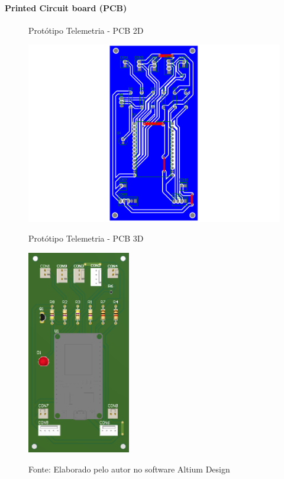 \documentclass[../delivery_hospital_report.tex]{subfiles}
\begin{document}
\paragraph{Printed Circuit board (PCB)}

\begin{figure}[!ht]
    \centering
    \begin{minipage}{0.5\textwidth}
        \centering
        \caption{Protótipo Telemetria - PCB 2D}
        \includegraphics[width=1.03\textwidth]{modulos/Telemetria-2.png} 
        \label{fig:figura1minipg}
    \end{minipage}\hfill
    \begin{minipage}{0.5\textwidth}
        \centering
        \caption{Protótipo Telemetria - PCB 3D }
        \includegraphics[width=0.4\textwidth]{modulos/Telemetria.png} 
        \label{fig:figura1minipg}
    \end{minipage}\hfill
    
    \caption*{Fonte: Elaborado pelo autor no software Altium Design\cite{altium21} }
    \label{fig:figurasminipg}
\end{figure}
\end{document}
